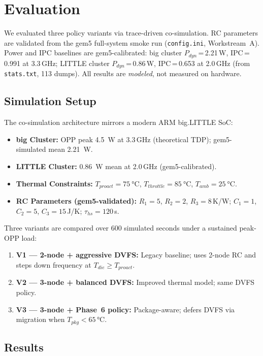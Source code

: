 \section{Evaluation}
\label{sec:evaluation}

We evaluated three policy variants via trace-driven co-simulation. RC parameters are validated from the gem5 full-system smoke run (\texttt{config.ini}, Workstream~A). Power and IPC baselines are gem5-calibrated: big cluster $P_{dyn}$\,=\,2.21\,W, IPC\,=\,0.991 at 3.3\,GHz; LITTLE cluster $P_{dyn}$\,=\,0.86\,W, IPC\,=\,0.653 at 2.0\,GHz (from \texttt{stats.txt}, 113 dumps). All results are \emph{modeled}, not measured on hardware.

\subsection{Simulation Setup}

The co-simulation architecture mirrors a modern ARM big.LITTLE SoC:
\begin{itemize}
    \item \textbf{big Cluster:} OPP peak \SI{4.5}{\watt} at 3.3\,GHz (theoretical TDP); gem5-simulated mean \SI{2.21}{\watt}.
    \item \textbf{LITTLE Cluster:} \SI{0.86}{\watt} mean at 2.0\,GHz (gem5-calibrated).
    \item \textbf{Thermal Constraints:} $T_{proact} = \SI{75}{\degreeCelsius}$, $T_{throttle} = \SI{85}{\degreeCelsius}$, $T_{amb} = \SI{25}{\degreeCelsius}$.
    \item \textbf{RC Parameters (gem5-validated):} $R_1\!=\!5$, $R_2\!=\!2$, $R_3\!=\!8$\,K/W; $C_1\!=\!1$, $C_2\!=\!5$, $C_3\!=\!15$\,J/K; $\tau_{hs}\!=\!120$\,s.
\end{itemize}

Three variants are compared over 600 simulated seconds under a sustained peak-OPP load:
\begin{enumerate}
    \item \textbf{V1 — 2-node + aggressive DVFS:} Legacy baseline; uses 2-node RC and steps down frequency at $T_{die} \geq T_{proact}$.
    \item \textbf{V2 — 3-node + balanced DVFS:} Improved thermal model; same DVFS policy.
    \item \textbf{V3 — 3-node + Phase~6 policy:} Package-aware; defers DVFS via migration when $T_{pkg} < 65\,\text{°C}$.
\end{enumerate}

\subsection{Results}

